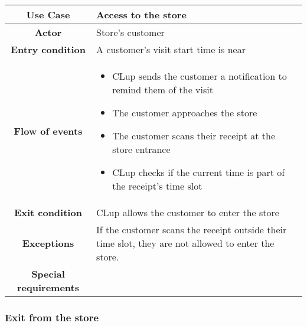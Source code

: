 \documentclass[../../main.tex]{subfiles}
\begin{document}
      \begin{table}[H]
        \centering
          \begin{tabular}{c m{}}
          \hline
          \textbf{Use Case} & Access to the store \\ \hline
          \textbf{Actor} & Store's customer\\ \hline
          \textbf{Entry condition} & A customer's visit start time is near\\  \hline
          \textbf{Flow of events} & \begin{itemize}
                                      \item CLup sends the customer a notification to remind them of the visit
                                      \item The customer approaches the store
                                      \item The customer scans their receipt at the store entrance
                                      \item CLup checks if the current time is part of the receipt's time slot
                                    \end{itemize}\\ \hline
          \textbf{Exit condition} & CLup allows the customer to enter the store \\ \hline
          \textbf{Exceptions} & If the customer scans the receipt outside their time slot, they are not allowed to enter the store. \\ \hline
          \textbf{Special requirements} &\\ \hline
          \end{tabular}
      \end{table}

      \subsubsection{Exit from the store}
\end{document}
